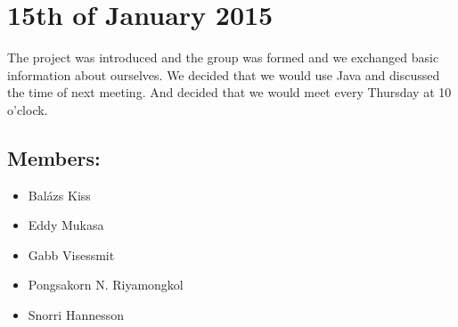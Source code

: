 \documentclass[11pt]{article}
\begin{document}
\section{15th of January 2015}
The project was introduced and the group was formed and we exchanged basic information about ourselves. We decided that we would use Java and discussed the time of next meeting. And decided that we would meet every Thursday at 10 o'clock.
\subsection{Members:}
\begin{itemize}
\item Balázs Kiss
\item Eddy Mukasa
\item Gabb Visessmit
\item Pongsakorn N. Riyamongkol
\item Snorri Hannesson
\end{itemize}
\newpage
\end{document}

